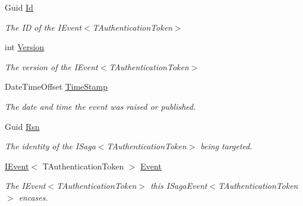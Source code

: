 \begin{DoxyCompactItemize}
Guid \hyperlink{classCqrs_1_1Events_1_1SagaEvent_a995f70a4311341459b96bd00488f0eea_a995f70a4311341459b96bd00488f0eea}{Id}
\begin{DoxyCompactList}\small\item\em The ID of the I\+Event$<$\+T\+Authentication\+Token$>$ \end{DoxyCompactList}\item 
int \hyperlink{classCqrs_1_1Events_1_1SagaEvent_a4918d2e0a66897600143f1e645a0f136_a4918d2e0a66897600143f1e645a0f136}{Version}
\begin{DoxyCompactList}\small\item\em The version of the I\+Event$<$\+T\+Authentication\+Token$>$ \end{DoxyCompactList}\item 
Date\+Time\+Offset \hyperlink{classCqrs_1_1Events_1_1SagaEvent_a6e522969d3456b62fe4291c5abc7e888_a6e522969d3456b62fe4291c5abc7e888}{Time\+Stamp}
\begin{DoxyCompactList}\small\item\em The date and time the event was raised or published. \end{DoxyCompactList}\item 
Guid \hyperlink{classCqrs_1_1Events_1_1SagaEvent_a7ed84d58bc5727966f3edba43dacf387_a7ed84d58bc5727966f3edba43dacf387}{Rsn}
\begin{DoxyCompactList}\small\item\em The identity of the I\+Saga$<$\+T\+Authentication\+Token$>$ being targeted. \end{DoxyCompactList}\item 
\hyperlink{interfaceCqrs_1_1Events_1_1IEvent}{I\+Event}$<$ T\+Authentication\+Token $>$ \hyperlink{classCqrs_1_1Events_1_1SagaEvent_ad965f37f2c485f04978237f0d1be9cb7_ad965f37f2c485f04978237f0d1be9cb7}{Event}
\begin{DoxyCompactList}\small\item\em The I\+Event$<$\+T\+Authentication\+Token$>$ this I\+Saga\+Event$<$\+T\+Authentication\+Token$>$ encases. \end{DoxyCompactList}\end{DoxyCompactItemize}


